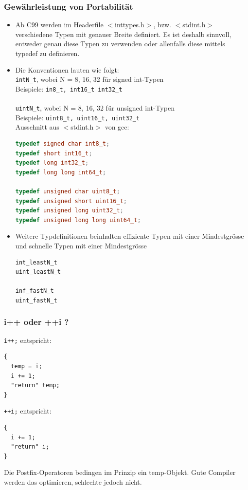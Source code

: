 \subsubsection{Gewährleistung von Portabilität}
\begin{itemize}
	\item Ab C99 werden im Headerfile $<$inttypes.h$>$, bzw. $<$stdint.h$>$ verschiedene Typen mit genauer Breite definiert. Es ist deshalb sinnvoll, entweder genau diese Typen zu verwenden oder allenfalls diese mittels typedef zu definieren.
	\item Die Konventionen lauten wie folgt:\\
	\lstinline{intN_t}, wobei N = 8, 16, 32 für signed int-Typen\\
	Beispiele: \lstinline{in8_t, int16_t int32_t}\\
	\\
	\lstinline{uintN_t}, wobei N = 8, 16, 32 für unsigned int-Typen\\
	Beispiele: \lstinline{uint8_t, uint16_t, uint32_t}\\
	Ausschnitt aus $<$stdint.h$>$ von gcc:
\begin{lstlisting}[language=C++]
typedef signed char int8_t;
typedef short int16_t;
typedef long int32_t;
typedef long long int64_t;

typedef unsigned char uint8_t;
typedef unsigned short uint16_t;
typedef unsigned long uint32_t;
typedef unsigned long long uint64_t;
\end{lstlisting}
\item Weitere Typdefinitionen beinhalten effiziente Typen mit einer Mindestgrösse und schnelle Typen mit einer Mindestgrösse
\begin{lstlisting}
int_leastN_t
uint_leastN_t

inf_fastN_t
uint_fastN_t
\end{lstlisting}
\end{itemize}

\subsubsection{i++ oder ++i ?}
\begin{multicols}{2}
\lstinline{i++;} entspricht:
\begin{lstlisting}
{
  temp = i;
  i += 1;
  "return" temp;
}
\end{lstlisting}
\vfill\null
\columnbreak
\lstinline{++i;} entspricht:
\begin{lstlisting}
{
  i += 1;
  "return" i;
}
\end{lstlisting}
\vfill\null
\end{multicols}
Die Postfix-Operatoren bedingen im Prinzip ein temp-Objekt. Gute Compiler werden das optimieren, schlechte jedoch nicht.

